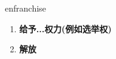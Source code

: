 
\begin{frame}
{\huge enfranchise}
\begin{center}
\begin{enumerate}\Large
  \item \textbf{给予...权力(例如选举权)}
  \item \textbf{解放}
\end{enumerate}
\end{center}
\end{frame}
